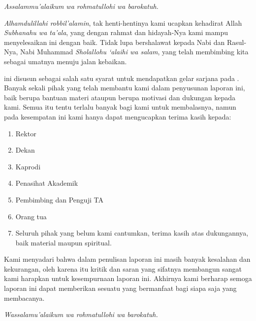 
\textit{Assalammu'alaikum wa rohmatullohi wa barokatuh.}

\textit{Alhamdulillahi robbil'alamin}, tak henti-hentinya kami ucapkan kehadirat Allah \textit{Subhanahu wa ta'ala}, yang dengan rahmat dan hidayah-Nya kami mampu menyelesaikan  ini dengan baik. Tidak lupa bershalawat kepada Nabi dan Rasul-Nya, Nabi Muhammad \textit{Sholallohu `alaihi wa salam}, yang telah membimbing kita sebagai umatnya menuju jalan kebaikan.

 ini disusun sebagai salah satu syarat untuk mendapatkan gelar sarjana pada   . Banyak sekali pihak yang telah membantu kami dalam penyusunan laporan ini, baik berupa bantuan materi ataupun berupa motivasi dan dukungan kepada kami. Semua itu tentu terlalu banyak bagi kami untuk membalasnya, namun pada kesempatan ini kami hanya dapat mengucapkan terima kasih kepada:
\begin{enumerate}
  \item Rektor 
  \item Dekan 
  \item Kaprodi 
  \item Penasihat Akademik 
  \item Pembimbing dan Penguji TA 
  \item Orang tua 
  \item Seluruh pihak yang belum kami cantumkan, terima kasih atas dukungannya, baik material maupun spiritual.
\end{enumerate}

Kami menyadari bahwa dalam penulisan laporan ini masih banyak kesalahan dan kekurangan, oleh karena itu kritik dan saran yang sifatnya membangun sangat kami harapkan untuk kesempurnaan laporan ini. Akhirnya kami berharap semoga laporan ini dapat memberikan sesuatu yang bermanfaat bagi siapa saja yang membacanya.

\textit{Wassalamu'alaikum wa rohmatullohi wa barokatuh.}

\TandaTanganPenulis{\makebox[30mm]{\dotfill}}   %
